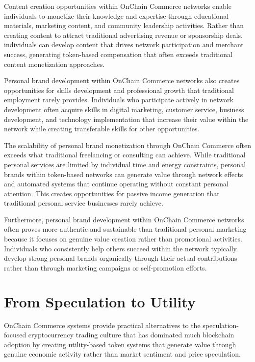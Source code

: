\documentclass[
  Letterpaper,
]{scrbook}
\begin{document}
Content creation opportunities within OnChain Commerce networks enable
individuals to monetize their knowledge and expertise through
educational materials, marketing content, and community leadership
activities. Rather than creating content to attract traditional
advertising revenue or sponsorship deals, individuals can develop
content that drives network participation and merchant success,
generating token-based compensation that often exceeds traditional
content monetization approaches.

Personal brand development within OnChain Commerce networks also creates
opportunities for skills development and professional growth that
traditional employment rarely provides. Individuals who participate
actively in network development often acquire skills in digital
marketing, customer service, business development, and technology
implementation that increase their value within the network while
creating transferable skills for other opportunities.

The scalability of personal brand monetization through OnChain Commerce
often exceeds what traditional freelancing or consulting can achieve.
While traditional personal services are limited by individual time and
energy constraints, personal brands within token-based networks can
generate value through network effects and automated systems that
continue operating without constant personal attention. This creates
opportunities for passive income generation that traditional personal
service businesses rarely achieve.

Furthermore, personal brand development within OnChain Commerce networks
often proves more authentic and sustainable than traditional personal
marketing because it focuses on genuine value creation rather than
promotional activities. Individuals who consistently help others succeed
within the network typically develop strong personal brands organically
through their actual contributions rather than through marketing
campaigns or self-promotion efforts.

\section{From Speculation to Utility}\label{from-speculation-to-utility}

OnChain Commerce systems provide practical alternatives to the
speculation-focused cryptocurrency trading culture that has dominated
much blockchain adoption by creating utility-based token systems that
generate value through genuine economic activity rather than market
sentiment and price speculation.
\end{document}
